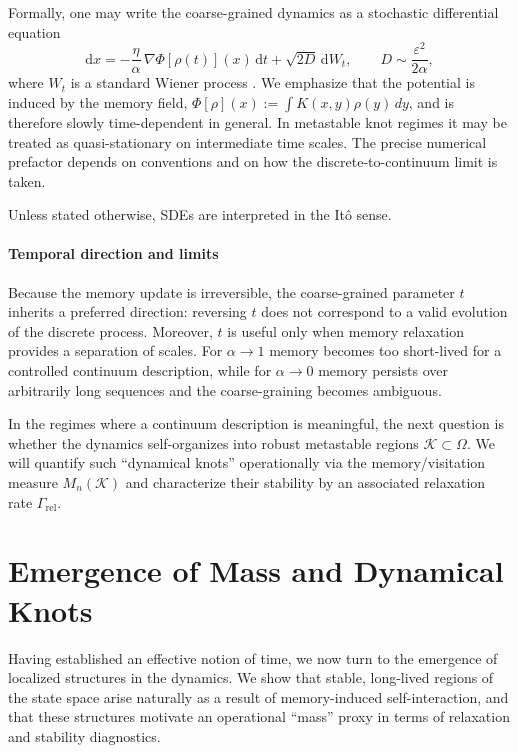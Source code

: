 \documentclass[reprint,amsmath,amssymb,aps,prd,nofootinbib,floatfix]{revtex4-2}
\begin{document}
Formally, one may write the coarse-grained dynamics as a stochastic differential equation
\begin{equation}
\mathrm{d}x = -\frac{\eta}{\alpha}\,\nabla\Phi[\rho(t)](x)\,\mathrm{d}t + \sqrt{2D}\,\mathrm{d}W_t,
\qquad
D \sim \frac{\varepsilon^2}{2\alpha},
\end{equation}
where $W_t$ is a standard Wiener process \cite{Oksendal2003,Risken1996}. We emphasize that the potential is induced by the memory field, $\Phi[\rho](x):=\int K(x,y)\rho(y)\,dy$, and is therefore slowly time-dependent in general.
In metastable knot regimes it may be treated as quasi-stationary on intermediate time scales. The precise numerical prefactor depends on conventions and on how the discrete-to-continuum limit is taken.

Unless stated otherwise, SDEs are interpreted in the It\^o sense.


\paragraph{Temporal direction and limits}
Because the memory update is irreversible, the coarse-grained parameter $t$ inherits a preferred direction: reversing $t$ does not correspond to a valid evolution of the discrete process.
Moreover, $t$ is useful only when memory relaxation provides a separation of scales.
For $\alpha\to 1$ memory becomes too short-lived for a controlled continuum description, while for $\alpha\to 0$ memory persists over arbitrarily long sequences and the coarse-graining becomes ambiguous.

In the regimes where a continuum description is meaningful, the next question is whether the dynamics self-organizes into robust metastable regions $\mathcal{K}\subset\Omega$.
We will quantify such ``dynamical knots'' operationally via the memory/visitation measure $M_n(\mathcal{K})$ and characterize their stability by an associated relaxation rate $\Gamma_{\mathrm{rel}}$.

\section{Emergence of Mass and Dynamical Knots}

Having established an effective notion of time, we now turn to the emergence of localized structures in the dynamics.
We show that stable, long-lived regions of the state space arise naturally as a result of memory-induced self-interaction, and that these structures motivate an operational ``mass'' proxy in terms of relaxation and stability diagnostics.
\end{document}
